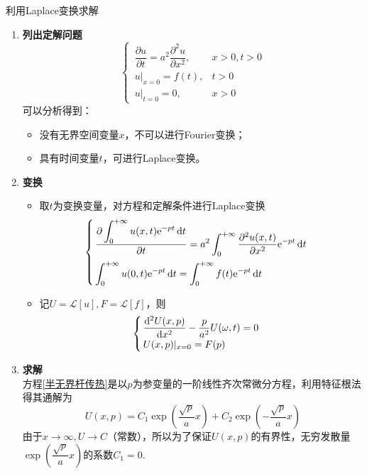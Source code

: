 \solve 利用Laplace变换求解
\begin{enumerate}
	\item \textbf{列出定解问题}
	\begin{equation}
		\begin{cases}
			\, \dfrac{\partial u}{\partial t} = a^2 \dfrac{\partial^2 u}{\partial x^2}, & x>0,t>0\\
			\, u|_{x = 0} = f(t), & t > 0\\
			\, u|_{t = 0} = 0, & x > 0
		\end{cases}
	\end{equation}
	\clearpage
	可以分析得到：
	\begin{itemize}
		\item 没有无界空间变量$x$，不可以进行Fourier变换；
		\item 具有时间变量$t$，可进行Laplace变换。
	\end{itemize}
	
	\item \textbf{变换}
	\begin{itemize}
		\item 取$t$为变换变量，对方程和定解条件进行Laplace变换
		\begin{equation}
			\begin{cases}
				\, \dfrac{\displaystyle \partial \int_{0}^{+\infty} u(x,t){\rm{e}}^{- p t} \, {\rm{d}} t}{\partial t} = \displaystyle a^2 \int_{0}^{+ \infty} \dfrac{\partial^2 u(x,t)}{\partial x^2} {\rm{e}}^{- p t}\, {\rm{d}} t \\[1em]
				\, \displaystyle \int_{0}^{+\infty} u(0,t) {\rm{e}}^{- p t}\, {\rm{d}} t = \int_{0}^{+ \infty}f(t){\rm{e}}^{-pt} \, {\rm{d}} t
			\end{cases}
		\end{equation}
		
		\item 记$U = \mathcal{L}[u],F = \mathcal{L}[f]$，则
		\begin{equation}
			\begin{cases}
				\, \dfrac{{\rm{d}}^2 U(x, p)}{{\rm{d}} x^2} - \dfrac{p}{a^2} U(\omega, t) = 0 \\
				\, U(x, p)|_{x = 0} = F(p)
			\end{cases}
			\label{半无界杆传热}
		\end{equation}
	\end{itemize}
	
	\item \textbf{求解}\\
	方程\eqref{半无界杆传热}是以$p$为参变量的一阶线性齐次常微分方程，利用特征根法得其通解为
	\begin{equation}
		U(x, p) = C_1 \exp \left(\dfrac{\sqrt{p}}{a}x\right) + C_2\exp \left(-\dfrac{\sqrt{p}}{a}x\right) 
	\end{equation}
	由于$x \to \infty, U \to C$（常数），所以为了保证$U(x, p)$的有界性，无穷发散量$\exp \left(\dfrac{\sqrt{p}}{a}x\right)$的系数$C_1 = 0.$
	

\end{enumerate}

